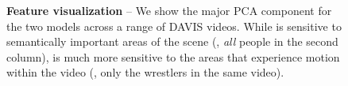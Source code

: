 
\begin{figure}[t]
\centering
{}
\setlength{\belowcaptionskip}{-5pt}
\caption{
\textbf{Feature visualization} --
We show the major PCA component for the two models across a range of DAVIS videos.
While \iwalt is sensitive to semantically important areas of the scene (\eg, \emph{all} people in the second column), \vwalt is much more sensitive to the areas that experience motion within the video (\eg, only the wrestlers in the same video).
}
\label{fig:qualitative1}
\end{figure}
